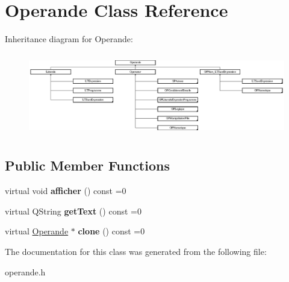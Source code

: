 \hypertarget{class_operande}{}\section{Operande Class Reference}
\label{class_operande}
Inheritance diagram for Operande\+:\begin{figure}[H]
\begin{center}
\leavevmode
\includegraphics[height=3.642277cm]{class_operande}
\end{center}
\end{figure}
\subsection*{Public Member Functions}
\begin{DoxyCompactItemize}
\item 
virtual void {\bfseries afficher} () const  =0\hypertarget{class_operande_ad723ef2e33ae865728804e228f4f5375}{}\label{class_operande_ad723ef2e33ae865728804e228f4f5375}

\item 
virtual Q\+String {\bfseries get\+Text} () const  =0\hypertarget{class_operande_a90c9dc4b24eb4e4206e53cff622f6f6d}{}\label{class_operande_a90c9dc4b24eb4e4206e53cff622f6f6d}

\item 
virtual \hyperlink{class_operande}{Operande} $\ast$ {\bfseries clone} () const  =0\hypertarget{class_operande_a9fccf1533e1f7bfcdbdaf0c448a013b9}{}\label{class_operande_a9fccf1533e1f7bfcdbdaf0c448a013b9}

\end{DoxyCompactItemize}


The documentation for this class was generated from the following file\+:\begin{DoxyCompactItemize}
\item 
operande.\+h\end{DoxyCompactItemize}
